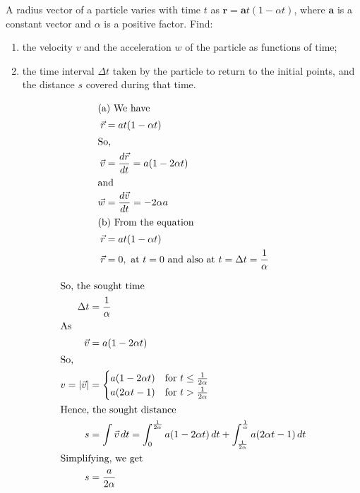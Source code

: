 
\item A radius vector of a particle varies with time $t$ as $\mathbf{r} = \mathbf{a}t (1 - \alpha t)$, where $\mathbf{a}$ is a constant vector and $\alpha$ is a positive factor.
Find:
\begin{enumerate}
    \item the velocity $v$ and the acceleration $w$ of the particle as functions of time;
    \item the time interval $\Delta t$ taken by the particle to return to the initial points, and the distance $s$ covered during that time.
\end{enumerate}

\begin{solution}
    
    \begin{align*}
        \intertext{(a) We have}
        \vec{r} &= at(1-\alpha t)\\
        \intertext{So,}
        \vec{v} &= \frac{d\vec{r}}{dt} = a(1-2\alpha t)\\
        \intertext{and}
        \vec{w} &= \frac{d\vec{v}}{dt} = -2\alpha a\\
        \intertext{(b) From the equation}
        \vec{r} &= at(1-\alpha t)\\
        \vec{r} &= 0, \text{ at } t=0 \text{ and also at } t=\Delta t = \frac{1}{\alpha}
    \end{align*}
    
    \begin{center}
    \end{center}
        
    \begin{align*}
        \intertext{So, the sought time}
        \Delta t & = \frac{1}{\alpha} \\
        \intertext{As}
        \vec{v} & = a (1-2\alpha t) \\
        \intertext{So,}
        v = |\vec{v}| & = 
        \begin{cases}
            a(1-2\alpha t) & \text{for } t \leq \frac{1}{2\alpha}\\
            a(2\alpha t-1) & \text{for } t > \frac{1}{2\alpha}
        \end{cases}\\
        \intertext{Hence, the sought distance}
        s & = \int \vec{v} \, dt = \int_{0}^{\frac{1}{2\alpha}}a(1-2\alpha t) \, dt + \int_{\frac{1}{2\alpha}}^{\frac{1}{\alpha}} a(2\alpha t-1) \, dt\\
        \intertext{Simplifying, we get}
        s & = \frac{a}{2\alpha}
    \end{align*}

\end{solution}
